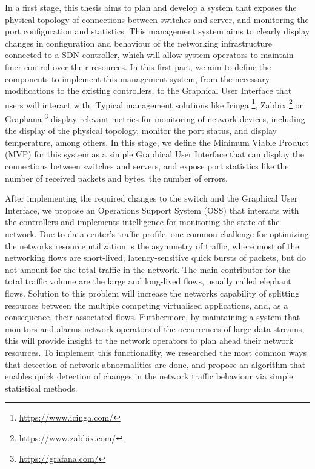 In a first stage, this thesis aims to plan and develop a system that exposes the physical topology of connections between switches and server, and monitoring
the port configuration and statistics. This management system aims to clearly display changes in configuration and behaviour of the networking infrastructure
connected to a SDN controller, which will allow system operators to maintain finer control over their resources. In this first part, we aim to define the 
components to implement this management system, from the necessary modifications to the existing controllers, to the Graphical User Interface that users will 
interact with. Typical management solutions like Icinga \footnote{\url{https://www.icinga.com/}}, Zabbix \footnote{\url{https://www.zabbix.com/}} or
Graphana \footnote{\url{https://grafana.com/}} display relevant metrics for monitoring of network devices, including the display of the
physical topology, monitor the port status, and display temperature, among others. In this stage, we define the Minimum Viable Product (MVP) for this system as a
simple Graphical User Interface that can display the connections between switches and servers, and expose port statistics like the number of received packets
and bytes, the number of errors.

\par After implementing the required changes to the switch and the Graphical User Interface, we propose an Operations Support System (OSS) that interacts with the
controllers and implements intelligence for monitoring the state of the network. Due to data center's traffic profile, one common challenge for optimizing the
networks resource utilization is the asymmetry of traffic, where most of the networking flows are short-lived, latency-sensitive quick bursts of packets, but do not
amount for the total traffic in the network. The main contributor for the total traffic volume are the large and long-lived flows, usually called elephant flows.
Solution to this problem will increase the networks capability of splitting resources between the multiple competing virtualised applications, and, as a consequence,
their associated flows. Furthermore, by maintaining a system that monitors and alarms network operators of the occurrences of large data streams, this will provide
insight to the network operators to plan ahead their network resources. To implement this functionality, we researched the most common ways that detection of network
abnormalities are done, and propose an algorithm that enables quick detection of changes in the network traffic behaviour via simple statistical methods.

